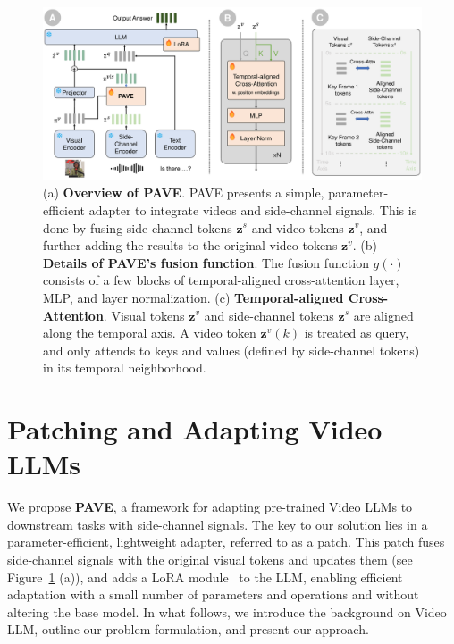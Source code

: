 \begin{figure}[t]
    \centering
    \includegraphics[width=0.85\linewidth]{new_figure_source/pave_overview_updated.pdf}
    \vspace{-0.5em}
    \caption{(a) \textbf{Overview of PAVE}. PAVE presents a simple, parameter-efficient adapter to integrate videos and side-channel signals. This is done by fusing side-channel tokens $\mathbf{z}^s$ and video tokens $\mathbf{z}^v$, and further adding the results to the original video tokens $\mathbf{z}^v$.  (b) \textbf{Details of PAVE's fusion function}. The fusion function $g(\cdot)$ consists of a few blocks of temporal-aligned cross-attention layer, MLP, and layer normalization. (c) \textbf{Temporal-aligned Cross-Attention}. Visual tokens $\mathbf{z}^v$ and side-channel tokens $\mathbf{z}^s$ are aligned along the temporal axis. A video token $\mathbf{z}^v(k)$ is treated as query, and only attends to keys and values (defined by side-channel tokens) in its temporal neighborhood.}
    \label{fig:structure_overview}
    \vspace{-1em}
\end{figure}

\section{Patching and Adapting Video LLMs}
\label{sec:method}

We propose \textbf{PAVE}, a framework for adapting pre-trained Video LLMs to downstream tasks with side-channel signals. The key to our solution lies in a parameter-efficient, lightweight adapter, referred to as a patch. 
This patch fuses side-channel signals with the original visual tokens and updates them (see Figure~\ref{fig:structure_overview} (a)), and adds a LoRA module~\cite{hu2021loralowrankadaptationlarge} to the LLM, enabling efficient adaptation with a small number of parameters and operations and without altering the base model. 
In what follows, we introduce the background on Video LLM, outline our problem formulation, and present our approach.


